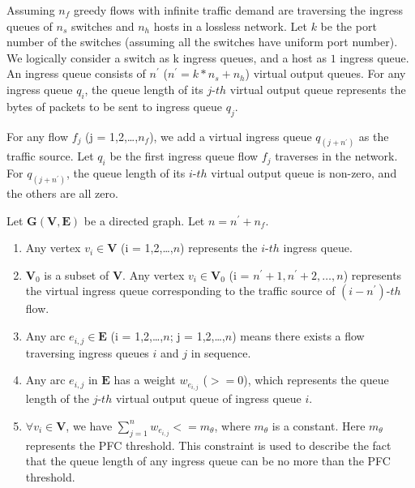 
Assuming $n_f$ greedy flows with infinite traffic demand are traversing the ingress queues of $n_s$ switches and $n_h$ hosts in a lossless network. Let $k$ be the port number of the switches (assuming all the switches have uniform port number). We logically consider a switch as k ingress queues, and a host as $1$ ingress queue. An ingress queue consists of $n^\prime$ ($n^\prime=k*n_s+n_h$) virtual output queues. For any ingress queue $q_i$, the queue length of its $j$-$th$ virtual output queue represents the bytes of packets to be sent to ingress queue $q_j$.

For any flow $f_j$ (j = 1,2,\ldots,$n_f$), we add a virtual ingress queue $q_{(j+n^\prime)}$ as the traffic source. Let $q_i$ be the first ingress queue flow $f_j$ traverses in the network. For $q_{(j+n^\prime)}$, the queue length of its $i$-$th$ virtual output queue is non-zero, and the others are all zero.

Let $\textbf{G}(\textbf{V},\textbf{E})$ be a directed graph. Let $n=n^\prime + n_f$.

\begin{enumerate}
\item Any vertex $v_i \in \textbf{V}$ (i = 1,2,\ldots,$n$) represents the $i$-$th$ ingress queue.

\item $\textbf{V}_0$ is a subset of $\textbf{V}$. Any vertex $v_i \in \textbf{V}_0$ (i = $n^\prime +1,n^\prime +2,\ldots,n$) represents the virtual ingress queue corresponding to the traffic source of $(i-n^\prime)$-$th$ flow.

\item Any arc $e_{i,j} \in \textbf{E}$ (i = 1,2,\ldots,$n$; j = 1,2,\ldots,$n$) means there exists a flow traversing ingress queues $i$ and $j$ in sequence.

\item Any arc $e_{i,j}$ in $\textbf{E}$ has a weight $w_{e_{i,j}}$ ($>=$0), which represents the queue length of the $j$-$th$ virtual output queue of ingress queue $i$.

\item $\forall v_i \in \textbf{V}$, we have $\sum_{j=1}^{n} w_{e_{i,j}} <= m_{\theta}$, where $ m_{\theta}$ is a constant. Here $ m_{\theta}$ represents the PFC threshold. This constraint is used to describe the fact that the queue length of any ingress queue can be no more than the PFC threshold.
\end{enumerate}

